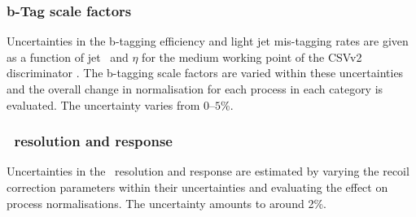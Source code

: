 \subsubsection*{b-Tag scale factors}
Uncertainties in the b-tagging efficiency and light jet mis-tagging
rates are given as a function of jet \pT~and $\eta$ for the 
medium working point of the \ac{CSV}v2 discriminator \cite{cms-btag-run2}.
The b-tagging scale factors are varied within these uncertainties
and the overall change in normalisation for each process in each category is
evaluated. The uncertainty varies from $0$--$5$\%.
\subsubsection*{\MET~resolution and response}
Uncertainties in the \MET~resolution and response are estimated
by varying the recoil correction parameters within their
uncertainties and evaluating the effect on process
normalisations. The uncertainty amounts to around 2\%.
